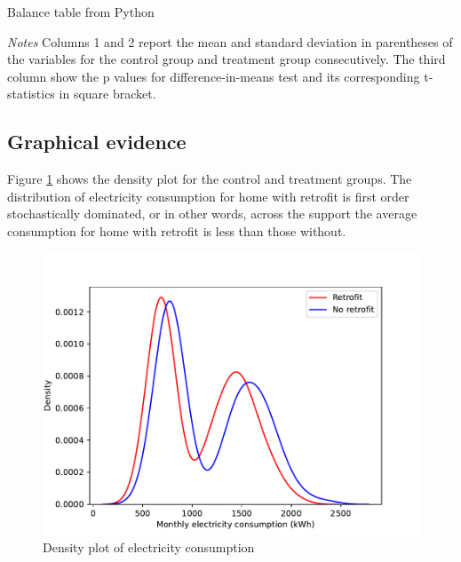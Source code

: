 \documentclass{article}
\begin{document}
\begin{table}[H]\centering
\begin{threeparttable}
    \caption{Balance table from Python}
    \label{t1:balance}
    
    \begin{tablenotes}
    \small \item \textit{Notes} Columns 1 and 2 report the mean and standard deviation in parentheses of the variables for the control group and treatment group consecutively. The third column show the p values for difference-in-means test and its corresponding t-statistics in square bracket.
    \end{tablenotes}
\end{threeparttable}
\end{table}

\subsection{Graphical evidence}
Figure \ref{f1:hist} shows the density plot for the control and treatment groups. The distribution of electricity consumption for home with retrofit is first order stochastically dominated, or in other words, across the support the average consumption for home with retrofit is less than those without.

\begin{figure}[H]
    \centering
    \includegraphics[scale = 0.6]{./figure/2_hist.pdf}
    \caption{Density plot of electricity consumption}
    \label{f1:hist}
\end{figure}
\end{document}
